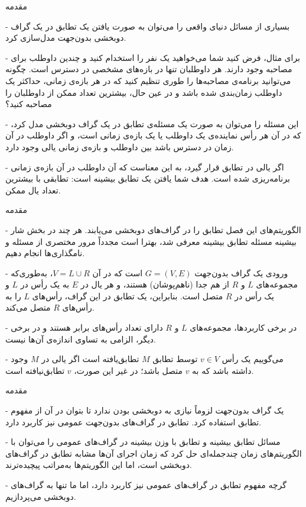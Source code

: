 \begin{itemframe}{مقدمه}
\item[-]
بسیاری از مسائل دنیای واقعی را می‌توان به صورت یافتن یک تطابق در یک گراف دوبخشی بدون‌جهت مدل‌سازی کرد.
\item[-]
برای مثال، فرض کنید شما می‌خواهید یک نفر را استخدام کنید و چندین داوطلب برای مصاحبه وجود دارند.
هر داوطلبان تنها در بازه‌های مشخصی در دسترس است. چگونه می‌توانید برنامه‌ی مصاحبه‌ها را طوری تنظیم کنید که در هر بازه‌ی زمانی، حداکثر یک داوطلب زمان‌بندی شده باشد و در عین حال، بیشترین تعداد ممکن از داوطلبان را مصاحبه کنید؟
\item[-]
 این مسئله را می‌توان به صورت یک مسئله‌ی تطابق در یک گراف دو‌بخشی مدل کرد، که در آن هر رأس نماینده‌ی یک داوطلب یا یک بازه‌ی زمانی است، و اگر داوطلب در آن زمان در دسترس باشد بین داوطلب و بازه‌ی زمانی یالی وجود دارد.
\item[-]
اگر یالی در تطابق قرار گیرد، به این معناست که آن داوطلب در آن بازه‌ی زمانی برنامه‌ریزی شده است. هدف شما یافتن یک تطابق بیشینه است: تطابقی با بیشترین تعداد یال ممکن.
\end{itemframe}


\begin{itemframe}{مقدمه}
\item[-]
الگوریتم‌های این فصل تطابق را در گراف‌های دو‌بخشی می‌یابند. هر چند در بخش شار بیشینه مسئله تطابق بیشینه معرفی شد، بهترا است مجدداً مرور مختصری از مسئله و نامگذاری‌ها انجام دهیم.
\item[-]
ورودی یک گراف بدون‌جهت $G = (V, E)$ است که در آن $V = L \cup R$، به‌طوری‌که مجموعه‌های $L$ و $R$ از هم جدا (ناهم‌پوشان) هستند، و هر یال در $E$ به یک رأس در $L$ و یک رأس در $R$ متصل است. بنابراین، یک تطابق در این گراف، رأس‌های $L$ را به رأس‌های $R$ متصل می‌کند.
\item[-]
در برخی کاربردها، مجموعه‌های $L$ و $R$ دارای تعداد رأس‌های برابر هستند و در برخی دیگر، الزامی به تساوی اندازه‌ی آن‌ها نیست.
\item[-]
می‌گوییم یک رأس $v \in V$ توسط تطابق $M$ تطابق‌یافته
 است اگر یالی در $M$ وجود داشته باشد که به $v$ متصل باشد؛ در غیر این صورت، $v$ تطابق‌نیافته
 است.
\end{itemframe}


\begin{itemframe}{مقدمه}
\item[-]
یک گراف بدون‌جهت لزوماً نیازی به دو‌بخشی بودن ندارد تا بتوان در آن از مفهوم تطابق استفاده کرد. تطابق در گراف‌های بدون‌جهت عمومی نیز کاربرد دارد.
\item[-]
مسائل تطابق بیشینه و تطابق با وزن بیشینه در گراف‌های عمومی را می‌توان با الگوریتم‌های زمان چندجمله‌ای حل کرد که زمان اجرای آن‌ها مشابه تطابق در گراف‌های دو‌بخشی است، اما این الگوریتم‌ها به‌مراتب پیچیده‌ترند.
\item[-]
 گرچه مفهوم تطابق در گراف‌های عمومی نیز کاربرد دارد، اما ما تنها به گراف‌های دو‌بخشی می‌پردازیم.
\end{itemframe}